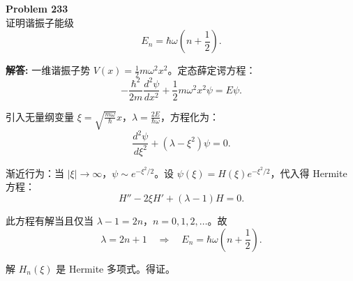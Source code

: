 \documentclass[12pt, a4paper, oneside]{ctexart}
\newenvironment{solution}{\par\noindent\textbf{解答:}\quad}{\par}
\begin{document}
\begin{mdframed}[backgroundcolor=gray!10, linewidth=0pt]
    \textbf{Problem 233} \\
    证明谐振子能级
    \[
    E_n = \hbar \omega \left( n + \frac{1}{2} \right).
    \]
\end{mdframed}
\begin{solution}
    一维谐振子势 $V(x) = \frac{1}{2} m \omega^2 x^2$。定态薛定谔方程：
    \[
    -\frac{\hbar^2}{2m} \frac{d^2 \psi}{dx^2} + \frac{1}{2} m \omega^2 x^2 \psi = E \psi.
    \]
    
    引入无量纲变量 $\xi = \sqrt{\frac{m\omega}{\hbar}} x$，$\lambda = \frac{2E}{\hbar \omega}$，方程化为：
    \[
    \frac{d^2 \psi}{d\xi^2} + (\lambda - \xi^2) \psi = 0.
    \]
    
    渐近行为：当 $|\xi| \to \infty$，$\psi \sim e^{-\xi^2/2}$。设 $\psi(\xi) = H(\xi) e^{-\xi^2/2}$，代入得 Hermite 方程：
    \[
    H'' - 2\xi H' + (\lambda - 1) H = 0.
    \]
    
    此方程有解当且仅当 $\lambda - 1 = 2n$，$n=0,1,2,\dots$。故
    \[
    \lambda = 2n + 1 \quad \Rightarrow \quad E_n = \hbar \omega \left( n + \frac{1}{2} \right).
    \]
    
    解 $H_n(\xi)$ 是 Hermite 多项式。得证。
\end{solution}
\end{document}
